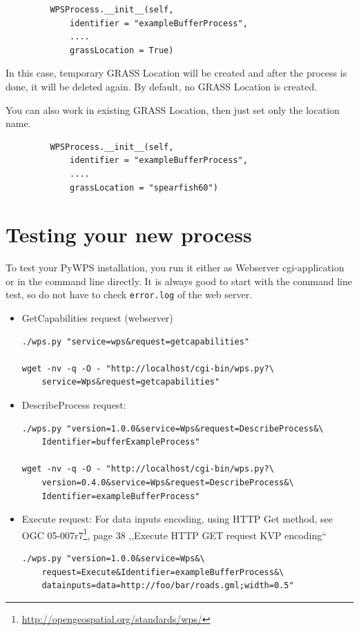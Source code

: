 \documentclass[a4paper,11pt]{article}
\newcommand{\pywpsDocCurrent}{OGC 05-007r7\footnote{\url{http://opengeospatial.org/standards/wps/}}}
\begin{document}
\begin{verbatim}
         WPSProcess.__init__(self,
             identifier = "exampleBufferProcess",
             ....
             grassLocation = True)
\end{verbatim}

In this case, temporary GRASS Location will be created and after the
process is done, it will be deleted again. By default, no GRASS Location is
created.

You can also work in existing GRASS Location, then just set only the location
name.
\begin{verbatim}
         WPSProcess.__init__(self,
             identifier = "exampleBufferProcess",
             ....
             grassLocation = "spearfish60")
\end{verbatim}

\section{Testing your new process}

To test your PyWPS installation, you run it either as Webserver
cgi-application or in the command line directly. It is always good to start
with the command line test, so do not have to check \texttt{error.log} of
the web server.

\begin{itemize}
    \item GetCapabilities request (webserver)
\begin{verbatim}
./wps.py "service=wps&request=getcapabilities"

wget -nv -q -O - "http://localhost/cgi-bin/wps.py?\
    service=Wps&request=getcapabilities"
\end{verbatim}
        
    \item DescribeProcess request:
\begin{verbatim}
./wps.py "version=1.0.0&service=Wps&request=DescribeProcess&\
    Identifier=bufferExampleProcess"

wget -nv -q -O - "http://localhost/cgi-bin/wps.py?\
    version=0.4.0&service=Wps&request=DescribeProcess&\
    Identifier=exampleBufferProcess"
\end{verbatim}
        
    \item Execute request:
            For data inputs encoding, using HTTP Get method, see
            \pywpsDocCurrent, page 38 ,,Execute HTTP GET request KVP
            encoding``
\begin{verbatim}
./wps.py "version=1.0.0&service=Wps&\
    request=Execute&Identifier=exampleBufferProcess&\
    datainputs=data=http://foo/bar/roads.gml;width=0.5"
\end{verbatim}
        
\end{itemize}
\end{document}
